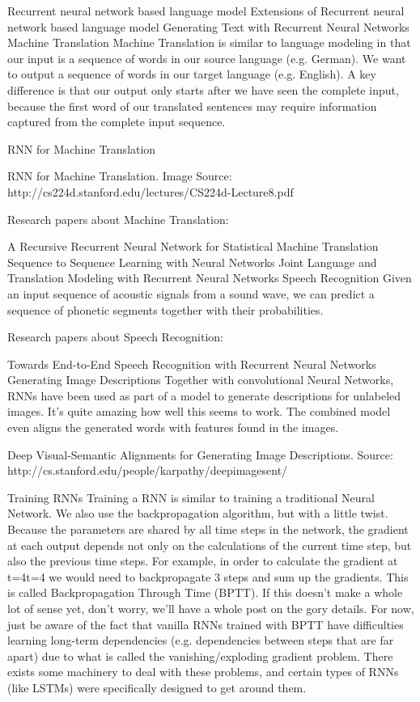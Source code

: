 Recurrent neural network based language model
Extensions of Recurrent neural network based language model
Generating Text with Recurrent Neural Networks
Machine Translation
Machine Translation is similar to language modeling in that our input is a sequence of words in our source language (e.g. German). We want to output a sequence of words in our target language (e.g. English). A key difference is that our output only starts after we have seen the complete input, because the first word of our translated sentences may require information captured from the complete input sequence.

RNN for Machine Translation



RNN for Machine Translation. Image Source: http://cs224d.stanford.edu/lectures/CS224d-Lecture8.pdf

Research papers about Machine Translation:

A Recursive Recurrent Neural Network for Statistical Machine Translation
Sequence to Sequence Learning with Neural Networks
Joint Language and Translation Modeling with Recurrent Neural Networks
Speech Recognition
Given an input sequence of acoustic signals from a sound wave, we can predict a sequence of phonetic segments together with their probabilities.

Research papers about Speech Recognition:

Towards End-to-End Speech Recognition with Recurrent Neural Networks
Generating Image Descriptions
Together with convolutional Neural Networks, RNNs have been used as part of a model to generate descriptions for unlabeled images. It’s quite amazing how well this seems to work. The combined model even aligns the generated words with features found in the images.



Deep Visual-Semantic Alignments for Generating Image Descriptions. Source: http://cs.stanford.edu/people/karpathy/deepimagesent/

Training RNNs
Training a RNN is similar to training a traditional Neural Network. We also use the backpropagation algorithm, but with a little twist. Because the parameters are shared by all time steps in the network, the gradient at each output depends not only on the calculations of the current time step, but also the previous time steps. For example, in order to calculate the gradient at t=4t=4 we would need to backpropagate 3 steps and sum up the gradients. This is called Backpropagation Through Time (BPTT). If this doesn’t make a whole lot of sense yet, don’t worry, we’ll have a whole post on the gory details. For now, just be aware of the fact that vanilla RNNs trained with BPTT have difficulties learning long-term dependencies (e.g. dependencies between steps that are far apart) due to what is called the vanishing/exploding gradient problem. There exists some machinery to deal with these problems, and certain types of RNNs (like LSTMs) were specifically designed to get around them.


